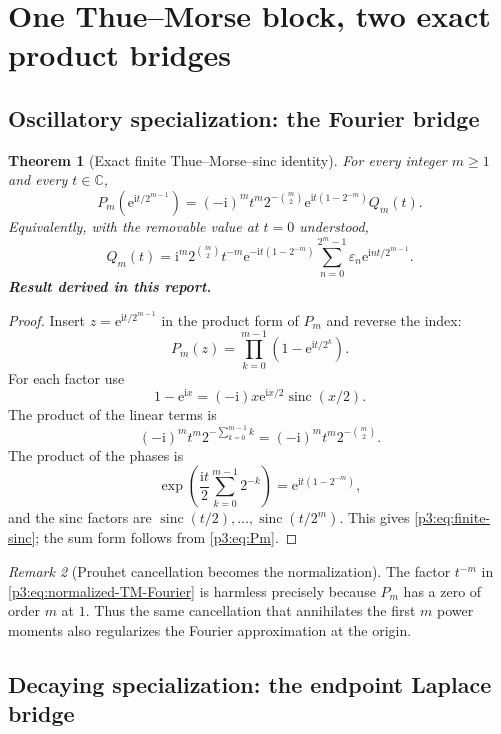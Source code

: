 \documentclass[11pt,oneside]{article}
\numberwithin{equation}{section}
\newtheorem{theorem}{Theorem}[section]
\theoremstyle{definition}
\theoremstyle{remark}
\newtheorem{remark}[theorem]{Remark}
\newcommand{\C}{\mathbb C}
\newcommand{\sinc}{\operatorname{sinc}}
\newcommand{\e}{\mathrm e}
\newcommand{\ii}{\mathrm i}
\newcommand{\eps}{\varepsilon}
\newcommand{\newresult}{\textbf{Result derived in this report.}}
\begin{document}
\section{One Thue--Morse block, two exact product bridges}
\label{p3:sec:bridges}

\subsection{Oscillatory specialization: the Fourier bridge}

\begin{theorem}[Exact finite Thue--Morse--sinc identity]
\label{p3:thm:finite-sinc}
For every integer $m\ge1$ and every $t\in\C$,
\begin{equation}
 \boxed{
 P_m\!\left(\e^{\ii t/2^{m-1}}\right)
 =(-\ii)^m t^m 2^{-\binom m2}
   \e^{\ii t(1-2^{-m})}Q_m(t).}
 \label{p3:eq:finite-sinc}
\end{equation}
Equivalently, with the removable value at $t=0$ understood,
\begin{equation}
 \boxed{
 Q_m(t)=\ii^m2^{\binom m2}t^{-m}
 \e^{-\ii t(1-2^{-m})}
 \sum_{n=0}^{2^m-1}\eps_n\e^{\ii nt/2^{m-1}}.}
 \label{p3:eq:normalized-TM-Fourier}
\end{equation}
\newresult
\end{theorem}

\begin{proof}
Insert $z=\e^{\ii t/2^{m-1}}$ in the product form of $P_m$ and reverse the
index:
\[
 P_m(z)=\prod_{k=0}^{m-1}\left(1-\e^{\ii t/2^k}\right).
\]
For each factor use
\[
 1-\e^{\ii x}=(-\ii)x\e^{\ii x/2}\sinc(x/2).
\]
The product of the linear terms is
\[
 (-\ii)^m t^m2^{-\sum_{k=0}^{m-1}k}
 =(-\ii)^m t^m2^{-\binom m2}.
\]
The product of the phases is
\[
 \exp\!\left(\frac{\ii t}{2}\sum_{k=0}^{m-1}2^{-k}\right)
 =\e^{\ii t(1-2^{-m})},
\]
and the sinc factors are $\sinc(t/2),\ldots,\sinc(t/2^m)$.  This gives
\eqref{p3:eq:finite-sinc}; the sum form follows from \eqref{p3:eq:Pm}.
\end{proof}

\begin{remark}[Prouhet cancellation becomes the normalization]
The factor $t^{-m}$ in \eqref{p3:eq:normalized-TM-Fourier} is harmless precisely because
$P_m$ has a zero of order $m$ at $1$.  Thus the same cancellation that annihilates the first
$m$ power moments also regularizes the Fourier approximation at the origin.
\end{remark}

\subsection{Decaying specialization: the endpoint Laplace bridge}
\end{document}
